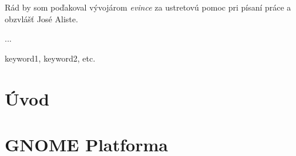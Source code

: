 \documentclass[12pt,oneside,final]{fithesis2}
\begin{document}
\FrontMatter
\ThesisTitlePage

\begin{ThesisDeclaration}
\DeclarationText
\AdvisorName
\end{ThesisDeclaration}

\begin{ThesisThanks}
Rád by som poďakoval vývojárom \emph{evince} za ustretovú pomoc pri písaní práce a obzvlášť José Aliste.
\end{ThesisThanks}  
 
\begin{ThesisAbstract}  
...
\end{ThesisAbstract}

\begin{ThesisKeyWords}
keyword1, keyword2, etc.
\end{ThesisKeyWords}
 
\MainMatter
\setcounter{tocdepth}{3}
\tableofcontents 
 
\chapter{Úvod}

 
\chapter{GNOME Platforma}
\end{document}
